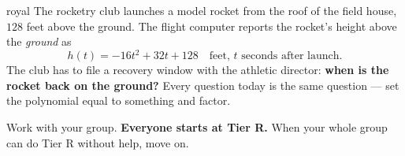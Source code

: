 \documentclass[10pt]{article}
\begin{document}

\vspace{0.15in}

\begin{scenariobox}{royal}
\small
The rocketry club launches a model rocket from the roof of the field house, $128$ feet above the
ground. The flight computer reports the rocket's height above the \emph{ground} as
\[ h(t) = -16t^2+32t+128 \quad \text{feet, } t \text{ seconds after launch.} \]
The club has to file a recovery window with the athletic director: \textbf{when is the rocket back
on the ground?} Every question today is the same question --- set the polynomial equal to something
and factor.

Work with your group. \textbf{Everyone starts at Tier R.} When your whole group can do Tier R
without help, move on.
\end{scenariobox}

\vspace{0.10in}
\end{document}
